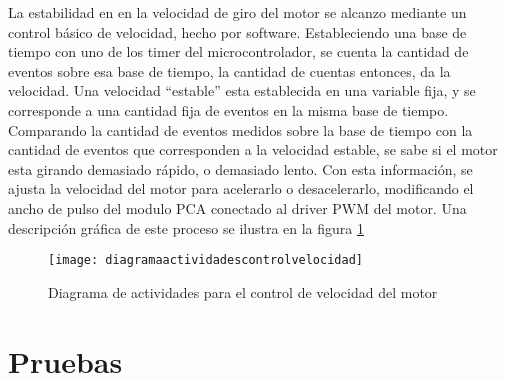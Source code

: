 La estabilidad en en la velocidad de giro del motor se alcanzo mediante un control básico de velocidad, hecho por software. Estableciendo una base de tiempo con uno de los timer del microcontrolador, se cuenta la cantidad de eventos sobre esa base de tiempo, la cantidad de cuentas entonces, da la velocidad. Una velocidad ``estable'' esta establecida en una variable fija, y se corresponde a una cantidad fija de eventos en la misma base de tiempo. Comparando la cantidad de eventos medidos sobre la base de tiempo con la cantidad de eventos que corresponden a la velocidad estable, se sabe si el motor esta girando demasiado rápido, o demasiado lento. Con esta información, se ajusta la velocidad del motor para acelerarlo o desacelerarlo, modificando el ancho de pulso del modulo PCA conectado al driver PWM del motor. Una descripción gráfica de este proceso se ilustra en la figura \ref{fig:diagramaactividadescontrolvelocidad}

\begin{figure}[h]
  \centering
  \texttt{[image: diagramaactividadescontrolvelocidad]}
  \caption{Diagrama de actividades para el control de velocidad del motor}\label{fig:diagramaactividadescontrolvelocidad}
\end{figure}





\section{Pruebas} %
\label{it6:sec:pruebas}

